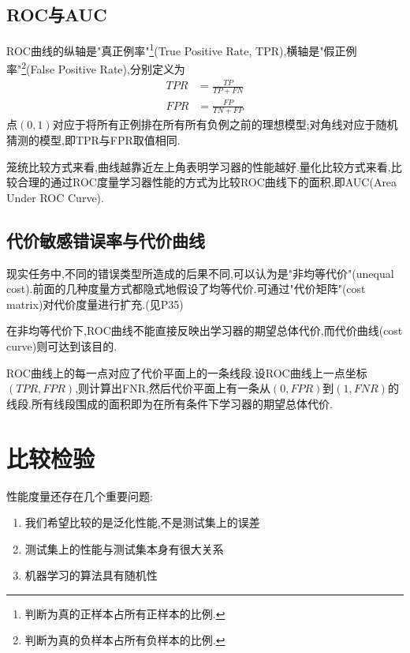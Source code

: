 \subsection{ROC与AUC}

ROC曲线的纵轴是"真正例率"\footnote{判断为真的正样本占所有正样本的比例.}(True Positive Rate, TPR),横轴是"假正例率"\footnote{判断为真的负样本占所有负样本的比例.}(False Positive Rate),分别定义为
\begin{equation}\begin{split}
TPR&=\frac{TP}{TP+FN}\\
FPR&=\frac{FP}{TN+FP}
\end{split}\end{equation}
点$(0,1)$对应于将所有正例排在所有所有负例之前的理想模型;对角线对应于随机猜测的模型,即TPR与FPR取值相同.

笼统比较方式来看,曲线越靠近左上角表明学习器的性能越好.量化比较方式来看,比较合理的通过ROC度量学习器性能的方式为比较ROC曲线下的面积,即AUC(Area Under ROC Curve).

\subsection{代价敏感错误率与代价曲线}

现实任务中,不同的错误类型所造成的后果不同,可以认为是"非均等代价"(unequal cost).前面的几种度量方式都隐式地假设了均等代价.可通过"代价矩阵"(cost matrix)对代价度量进行扩充.(见P35)

在非均等代价下,ROC曲线不能直接反映出学习器的期望总体代价,而代价曲线(cost curve)则可达到该目的.

ROC曲线上的每一点对应了代价平面上的一条线段.设ROC曲线上一点坐标$(TPR,FPR)$,则计算出FNR,然后代价平面上有一条从$(0,FPR)$到$(1,FNR)$的线段.所有线段围成的面积即为在所有条件下学习器的期望总体代价.

\section{比较检验}

性能度量还存在几个重要问题:

\begin{enumerate}
\item 我们希望比较的是泛化性能,不是测试集上的误差
\item 测试集上的性能与测试集本身有很大关系
\item 机器学习的算法具有随机性
\end{enumerate}

